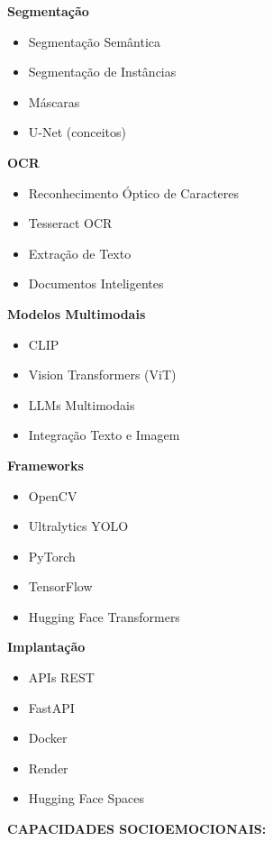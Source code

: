 \textbf{Segmentação}

\begin{itemize}
\item Segmentação Semântica
\item Segmentação de Instâncias
\item Máscaras
\item U-Net (conceitos)
\end{itemize}

\textbf{OCR}

\begin{itemize}
\item Reconhecimento Óptico de Caracteres
\item Tesseract OCR
\item Extração de Texto
\item Documentos Inteligentes
\end{itemize}

\textbf{Modelos Multimodais}

\begin{itemize}
\item CLIP
\item Vision Transformers (ViT)
\item LLMs Multimodais
\item Integração Texto e Imagem
\end{itemize}

\textbf{Frameworks}

\begin{itemize}
\item OpenCV
\item Ultralytics YOLO
\item PyTorch
\item TensorFlow
\item Hugging Face Transformers
\end{itemize}

\textbf{Implantação}

\begin{itemize}
\item APIs REST
\item FastAPI
\item Docker
\item Render
\item Hugging Face Spaces
\end{itemize}

\textbf{CAPACIDADES SOCIOEMOCIONAIS:}

